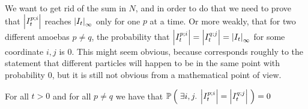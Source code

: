 We want to get rid of the sum in $N$, and in order to do that we need to prove that $\left| I_t^{p;i} \right|$ reaches ${ \left| I_t \right|_{\infty} }$ only for one $p$ at a time.
Or more weakly, that for two different amoebas $p\neq q$, the probability that $\left| I_t^{p;i} \right|= \left| I_t^{q;j} \right|= { \left| I_t \right|_{\infty} }$ for some coordinate $i,j$ is $0$.
This might seem obvious, because corresponds roughly to the statement that different particles will happen to be in the same point with probability $0$, but it is still not obvious from a mathematical point of view.

\begin{lemma}\label{ch4:only-one-amoeba-will-survive}
	For all $t>0$ and for all $p \neq q$ we have that $\mathbb{P} \left( \; \exists i,j.\:\left| I_t^{p;i} \right|= \left| I_t^{q;j} \right| \; \right) = 0$
\end{lemma}

